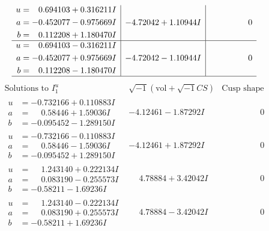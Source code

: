 \documentclass[1p]{elsarticle_modified}
\theoremstyle{definition}
\newcommand{\I}{\sqrt{-1}}
\begin{document}
$$\begin{array}{c|c|c}
\begin{aligned}
u &= \phantom{-}0.694103 + 0.316211 I \\
a &= -0.452077 - 0.975669 I \\
b &= \phantom{-}0.112208 + 1.180470 I\end{aligned}
 & -4.72042 + 1.10944 I & \phantom{-0.000000 } 0 \\ \hline\begin{aligned}
u &= \phantom{-}0.694103 - 0.316211 I \\
a &= -0.452077 + 0.975669 I \\
b &= \phantom{-}0.112208 - 1.180470 I\end{aligned}
 & -4.72042 - 1.10944 I & \phantom{-0.000000 } 0\\
 \hline 
 \end{array}$$\newpage$$\begin{array}{c|c|c}  
\text{Solutions to }I^u_{1}& \I (\text{vol} + \sqrt{-1}CS) & \text{Cusp shape}\\
 \hline 
\begin{aligned}
u &= -0.732166 + 0.110883 I \\
a &= \phantom{-}0.58446 + 1.59036 I \\
b &= -0.095452 - 1.289150 I\end{aligned}
 & -4.12461 - 1.87292 I & \phantom{-0.000000 } 0 \\ \hline\begin{aligned}
u &= -0.732166 - 0.110883 I \\
a &= \phantom{-}0.58446 - 1.59036 I \\
b &= -0.095452 + 1.289150 I\end{aligned}
 & -4.12461 + 1.87292 I & \phantom{-0.000000 } 0 \\ \hline\begin{aligned}
u &= \phantom{-}1.243140 + 0.222134 I \\
a &= \phantom{-}0.083190 - 0.255573 I \\
b &= -0.58211 - 1.69236 I\end{aligned}
 & \phantom{-}4.78884 + 3.42042 I & \phantom{-0.000000 } 0 \\ \hline\begin{aligned}
u &= \phantom{-}1.243140 - 0.222134 I \\
a &= \phantom{-}0.083190 + 0.255573 I \\
b &= -0.58211 + 1.69236 I\end{aligned}
 & \phantom{-}4.78884 - 3.42042 I & \phantom{-0.000000 } 0 \\ \hline\begin{aligned}

\end{aligned}
\end{array}$$
\end{document}
